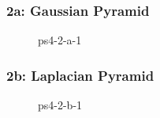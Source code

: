 \documentclass[../report.tex]{subfiles}
\begin{document}
    
    \begin{frame}
        \frametitle{2a: Gaussian Pyramid}
        \begin{figure}[!htb]
            \centering
            \caption{ps4-2-a-1}
        \end{figure}    
    \end{frame}

    \begin{frame}
        \frametitle{2b: Laplacian Pyramid}
        \begin{figure}[!htb]
            \centering
            \caption{ps4-2-b-1}
        \end{figure}    
    \end{frame}
    
\end{document}
